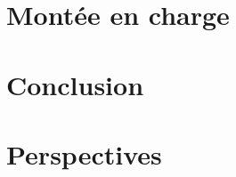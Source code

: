 \documentclass[
    iict, %
    il, %
]{heig-tb}
\begin{document}
\chapter{Montée en charge}


% 
% 

\chapter{Conclusion}


\chapter{Perspectives}
\label{perspectives}


\clearpage
\printbibliography

\appendix
\appendixpage
\addappheadtotoc







\let\cleardoublepage\clearpage
\backmatter

\label{glossaire}
\printnoidxglossary
\label{index}
\printindex

% 
\end{document}
